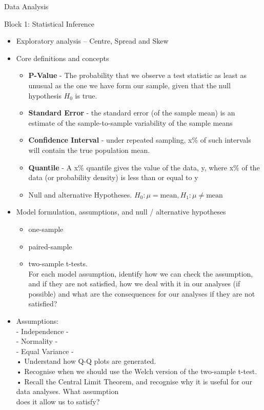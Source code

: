 \documentclass[
  ignorenonframetext,
]{beamer}
\providecommand{\tightlist}{%
  \setlength{\itemsep}{0pt}\setlength{\parskip}{0pt}}
\begin{document}
\begin{frame}{Data Analysis}
\begin{block}{Block 1: Statistical Inference}
\protect\hypertarget{block-1-statistical-inference}{}
\begin{itemize}
\item
  Exploratory analysis -- Centre, Spread and Skew
\item
  Core definitions and concepts

  \begin{itemize}
  \tightlist
  \item
    \textbf{P-Value} - The probability that we observe a test statistic
    as least as unusual as the one we have form our sample, given that
    the null hypothesis {\(H_{0}\)} is true.
  \item
    \textbf{Standard Error} - the standard error (of the sample mean) is
    an estimate of the sample-to-sample variability of the sample means
  \item
    \textbf{Confidence Interval} - under repeated sampling, x\% of such
    intervals will contain the true population mean.
  \item
    \textbf{Quantile} - A x\% quantile gives the value of the data, y,
    where x\% of the data (or probability density) is less than or equal
    to y
  \item
    Null and alternative Hypotheses.
    {\(H_{0}:\mu = \text{mean},H_{1}:\mu \neq \text{mean}\)}
  \end{itemize}
\item
  Model formulation, assumptions, and null / alternative hypotheses

  \begin{itemize}
  \tightlist
  \item
    one-sample
  \item
    paired-sample
  \item
    two-sample t-tests.\\
    For each model assumption, identify how we can check the assumption,
    and if they are not satisfied, how we deal with it in our analyses
    (if possible) and what are the consequences for our analyses if they
    are not satisfied?
  \end{itemize}
\item
  Assumptions:\\
  - Independence -\\
  - Normality -\\
  - Equal Variance -\\
  • Understand how Q-Q plots are generated.\\
  • Recognise when we should use the Welch version of the two-sample
  t-test.\\
  • Recall the Central Limit Theorem, and recognise why it is useful for
  our data analyses. What assumption\\
  does it allow us to satisfy?
\end{itemize}


\end{block}
\end{frame}
\end{document}
